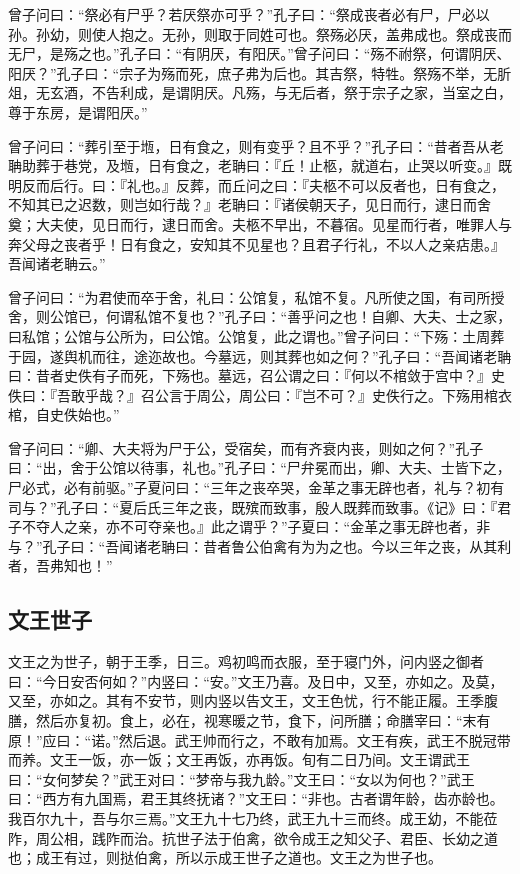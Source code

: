 \documentclass[]{article}
\begin{document}
曾子问曰：``祭必有尸乎？若厌祭亦可乎？''孔子曰：``祭成丧者必有尸，尸必以孙。孙幼，则使人抱之。无孙，则取于同姓可也。祭殇必厌，盖弗成也。祭成丧而无尸，是殇之也。''孔子曰：``有阴厌，有阳厌。''曾子问曰：``殇不祔祭，何谓阴厌、阳厌？''孔子曰：``宗子为殇而死，庶子弗为后也。其吉祭，特牲。祭殇不举，无肵俎，无玄酒，不告利成，是谓阴厌。凡殇，与无后者，祭于宗子之家，当室之白，尊于东房，是谓阳厌。''

曾子问曰：``葬引至于堩，日有食之，则有变乎？且不乎？''孔子曰：``昔者吾从老聃助葬于巷党，及堩，日有食之，老聃曰：『丘！止柩，就道右，止哭以听变。』既明反而后行。曰：『礼也。』反葬，而丘问之曰：『夫柩不可以反者也，日有食之，不知其已之迟数，则岂如行哉？』老聃曰：『诸侯朝天子，见日而行，逮日而舍奠；大夫使，见日而行，逮日而舍。夫柩不早出，不暮宿。见星而行者，唯罪人与奔父母之丧者乎！日有食之，安知其不见星也？且君子行礼，不以人之亲痁患。』吾闻诸老聃云。''

曾子问曰：``为君使而卒于舍，礼曰：公馆复，私馆不复。凡所使之国，有司所授舍，则公馆已，何谓私馆不复也？''孔子曰：``善乎问之也！自卿、大夫、士之家，曰私馆；公馆与公所为，曰公馆。公馆复，此之谓也。''曾子问曰：``下殇：土周葬于园，遂舆机而往，途迩故也。今墓远，则其葬也如之何？''孔子曰：``吾闻诸老聃曰：昔者史佚有子而死，下殇也。墓远，召公谓之曰：『何以不棺敛于宫中？』史佚曰：『吾敢乎哉？』召公言于周公，周公曰：『岂不可？』史佚行之。下殇用棺衣棺，自史佚始也。''

曾子问曰：``卿、大夫将为尸于公，受宿矣，而有齐衰内丧，则如之何？''孔子曰：``出，舍于公馆以待事，礼也。''孔子曰：``尸弁冕而出，卿、大夫、士皆下之，尸必式，必有前驱。''子夏问曰：``三年之丧卒哭，金革之事无辟也者，礼与？初有司与？''孔子曰：``夏后氏三年之丧，既殡而致事，殷人既葬而致事。《记》曰：『君子不夺人之亲，亦不可夺亲也。』此之谓乎？''子夏曰：``金革之事无辟也者，非与？''孔子曰：``吾闻诸老聃曰：昔者鲁公伯禽有为为之也。今以三年之丧，从其利者，吾弗知也！''

\hypertarget{header-n392}{%
\subsection{文王世子}\label{header-n392}}

文王之为世子，朝于王季，日三。鸡初鸣而衣服，至于寝门外，问内竖之御者曰：``今日安否何如？''内竖曰：``安。''文王乃喜。及日中，又至，亦如之。及莫，又至，亦如之。其有不安节，则内竖以告文王，文王色忧，行不能正履。王季腹膳，然后亦复初。食上，必在，视寒暖之节，食下，问所膳；命膳宰曰：``末有原！''应曰：``诺。''然后退。武王帅而行之，不敢有加焉。文王有疾，武王不脱冠带而养。文王一饭，亦一饭；文王再饭，亦再饭。旬有二日乃间。文王谓武王曰：``女何梦矣？''武王对曰：``梦帝与我九龄。''文王曰：``女以为何也？''武王曰：``西方有九国焉，君王其终抚诸？''文王曰：``非也。古者谓年龄，齿亦龄也。我百尔九十，吾与尔三焉。''文王九十七乃终，武王九十三而终。成王幼，不能莅阼，周公相，践阼而治。抗世子法于伯禽，欲令成王之知父子、君臣、长幼之道也；成王有过，则挞伯禽，所以示成王世子之道也。文王之为世子也。
\end{document}
